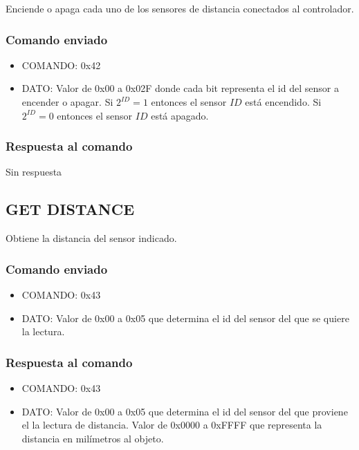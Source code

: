 \documentclass[a4paper,10pt]{article}
\begin{document}
Enciende o apaga cada uno de los sensores de distancia conectados al controlador.

\subsubsection*{Comando enviado}

\begin{itemize}
	\item{COMANDO:} 0x42
	\item{DATO:} Valor de 0x00 a 0x02F donde cada bit representa el id del sensor a encender o apagar.
	Si $2^{ID} = 1$ entonces el sensor $ID$ est\'a encendido.
	Si $2^{ID} = 0$ entonces el sensor $ID$ est\'a apagado.
\end{itemize}

\subsubsection*{Respuesta al comando}

Sin respuesta

\subsection{GET DISTANCE}
\label{get_distance_ds}

Obtiene la distancia del sensor indicado.

\subsubsection*{Comando enviado}

\begin{itemize}
	\item{COMANDO:} 0x43
	\item{DATO:} Valor de 0x00 a 0x05 que determina el id del sensor del que se quiere la lectura.
\end{itemize}

\subsubsection*{Respuesta al comando}

\begin{itemize}
	\item{COMANDO:} 0x43
	\item{DATO:} Valor de 0x00 a 0x05 que determina el id del sensor del que proviene el la lectura de distancia.
	Valor de 0x0000 a 0xFFFF que representa la distancia en mil\'imetros al objeto.
\end{itemize}
\end{document}
